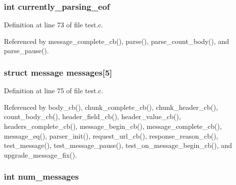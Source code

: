 \subsubsection[{currently\+\_\+parsing\+\_\+eof}]{\setlength{\rightskip}{0pt plus 5cm}int currently\+\_\+parsing\+\_\+eof\hspace{0.3cm}{\ttfamily [static]}}\label{test_8c_ae9895f5b52d281a9eae03cc5c36b5010}


Definition at line 73 of file test.\+c.



Referenced by message\+\_\+complete\+\_\+cb(), parse(), parse\+\_\+count\+\_\+body(), and parse\+\_\+pause().

\subsubsection[{messages}]{\setlength{\rightskip}{0pt plus 5cm}struct {\bf message} messages[5]\hspace{0.3cm}{\ttfamily [static]}}\label{test_8c_a508ec1c400816293decba070bd706934}


Definition at line 75 of file test.\+c.



Referenced by body\+\_\+cb(), chunk\+\_\+complete\+\_\+cb(), chunk\+\_\+header\+\_\+cb(), count\+\_\+body\+\_\+cb(), header\+\_\+field\+\_\+cb(), header\+\_\+value\+\_\+cb(), headers\+\_\+complete\+\_\+cb(), message\+\_\+begin\+\_\+cb(), message\+\_\+complete\+\_\+cb(), message\+\_\+eq(), parser\+\_\+init(), request\+\_\+url\+\_\+cb(), response\+\_\+reason\+\_\+cb(), test\+\_\+message(), test\+\_\+message\+\_\+pause(), test\+\_\+on\+\_\+message\+\_\+begin\+\_\+cb(), and upgrade\+\_\+message\+\_\+fix().

\subsubsection[{num\+\_\+messages}]{\setlength{\rightskip}{0pt plus 5cm}int num\+\_\+messages\hspace{0.3cm}{\ttfamily [static]}}\label{test_8c_a8a04037d0814a8feb187a21859cb06c2}


